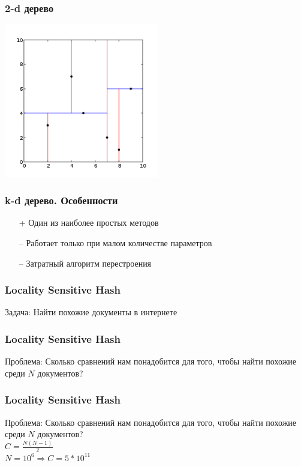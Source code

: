 \documentclass[10pt]{beamer}
\begin{document}
\begin{frame}\frametitle{2-d дерево}
	\begin{center}
    	\includegraphics[height=190pt]{images/Kdtree_2d}  	
	\end{center}
\end{frame}

\begin{frame}\frametitle{k-d дерево. Особенности}
	\begin{itemize}
	\item[+] Один из наиболее простых методов
	\item[--] Работает только при малом количестве параметров
	\item[--] Затратный алгоритм перестроения
	\end{itemize}
\end{frame}

\begin{frame}\frametitle{Locality Sensitive Hash}
  \alert{Задача}: Найти похожие документы в интернете\\
\end{frame}

\begin{frame}\frametitle{Locality Sensitive Hash}
	\centering
	\alert{Проблема}: Сколько сравнений нам понадобится  для того, чтобы найти похожие среди $N$ документов?\\
\end{frame}

\begin{frame}\frametitle{Locality Sensitive Hash}
	\alert{Проблема}: Сколько сравнений нам понадобится  для того, чтобы найти похожие среди $N$ документов?\\
	\vspace{5mm}
	$C = \frac{N(N-1)}{2}$\\
	\vspace{5mm}
	$N = 10^6 \Rightarrow C = 5*10^{11}$
\end{frame}
\end{document}
